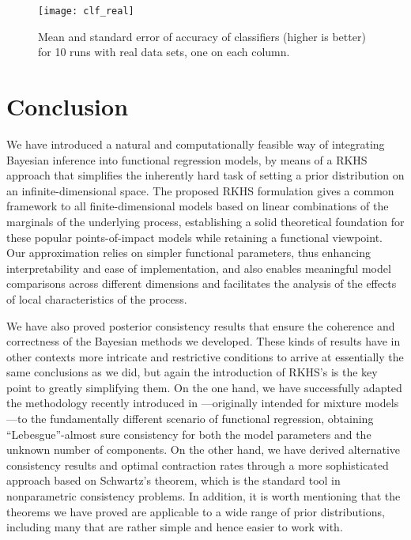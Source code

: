 \documentclass{article}
\numberwithin{equation}{section}
\theoremstyle{plain}
\theoremstyle{definition}
\begin{document}
\begin{figure}[ht!]
  \centering
  \texttt{[image: clf\_real]}
  \caption{Mean and standard error of accuracy of classifiers (higher is better) for 10 runs with real data sets, one on each column.}\label{fig:clf_real}
\end{figure}


\section{Conclusion}\label{sec:conclusion}

We have introduced a natural and computationally feasible way of integrating Bayesian inference into functional regression models, by means of a RKHS approach that simplifies the inherently hard task of setting a prior distribution on an infinite-dimensional space. The proposed RKHS formulation gives a common framework to all finite-dimensional models based on linear combinations of the marginals of the underlying process, establishing a solid theoretical foundation for these popular points-of-impact models while retaining a functional viewpoint. Our approximation relies on simpler functional parameters, thus enhancing interpretability and ease of implementation, and also enables meaningful model comparisons across different dimensions and facilitates the analysis of the effects of local characteristics of the process.

We have also proved posterior consistency results that ensure the coherence and correctness of the Bayesian methods we developed. These kinds of results have in other contexts more intricate and restrictive conditions to arrive at essentially the same conclusions as we did, but again the introduction of RKHS's is the key point to greatly simplifying them. On the one hand, we have successfully adapted the methodology recently introduced in \citet{miller2023consistency}---originally intended for mixture models---to the fundamentally different scenario of functional regression, obtaining ``Lebesgue''-almost sure consistency for both the model parameters and the unknown number of components. On the other hand, we have derived alternative consistency results and optimal contraction rates through a more sophisticated approach based on Schwartz's theorem, which is the standard tool in nonparametric consistency problems. In addition, it is worth mentioning that the theorems we have proved are applicable to a wide range of prior distributions, including many that are rather simple and hence easier to work with.
\end{document}
